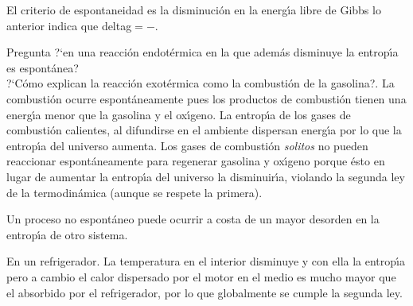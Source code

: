El criterio de espontaneidad es la disminuci\'on en la energ\'{\i}a libre de Gibbs lo anterior indica que 
\gls{deltag}$ = -$.

Pregunta ?`en una reacci\'on endot\'ermica en la que adem\'as disminuye la entrop\'{\i}a es
espont\'anea?\\ 
?`C\'omo explican la reacci\'on exot\'ermica como la combusti\'on de la gasolina?.
La combusti\'on ocurre  espont\'aneamente pues los productos de combusti\'on tienen una energ\'{\i}a menor que la gasolina y el ox\'{\i}geno. La entrop\'{\i}a de los gases de combusti\'on calientes, al difundirse en el ambiente dispersan e\-nerg\'{\i}a por lo que la entrop\'{\i}a del universo aumenta. Los gases de com\-busti\'on \textit{solitos} no pueden reaccionar espont\'aneamente para regenerar gasolina y ox\'{\i}geno porque \'esto en lugar de aumentar la entrop\'{\i}a del universo la disminuir\'{\i}a, violando la segunda ley de la termodin\'amica (aunque se respete la primera).

Un proceso no espont\'aneo puede ocurrir a costa de un mayor desorden en la entrop\'{\i}a de otro sistema.

En un refrigerador. La temperatura en el interior disminuye y con ella la entrop\'{\i}a pero
a cambio el calor dispersado por el motor en el medio es mucho mayor que el absorbido por el
refrigerador, por lo que globalmente se cumple la segunda ley.

